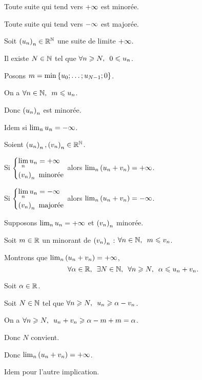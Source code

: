\begin{prop}
Toute suite qui tend vers \(+\infty\) est minorée.

Toute suite qui tend vers \(-\infty\) est majorée.
\end{prop}

\begin{dem}
Soit \(\left(u_n\right)_n\in\mathbb{R}^{\mathbb{N}}\) une suite de limite \(+\infty\).

Il existe \(N\in\mathbb{N}\) tel que \(\quantifs{\forall n\geq N}0\leq u_n\).

Posons \(m=\min\left\lbrace u_0;\dots;u_{N-1};0\right\rbrace\).

On a \(\quantifs{\forall n\in\N}m\leq u_n\).

Donc \(\left(u_n\right)_n\) est minorée.

Idem si \(\lim_nu_n=-\infty\).
\end{dem}

\begin{prop}
Soient \(\left(u_n\right)_n,\left(v_n\right)_n\in\mathbb{R}^{\mathbb{N}}\).

Si \(\begin{dcases}\lim_nu_n=+\infty \\ \left(v_n\right)_n\text{ minorée}\end{dcases}\) alors \(\lim_n\left(u_n+v_n\right)=+\infty\).

Si \(\begin{dcases}\lim_nu_n=-\infty \\ \left(v_n\right)_n\text{ majorée}\end{dcases}\) alors \(\lim_n\left(u_n+v_n\right)=-\infty\).
\end{prop}

\begin{dem}
Supposons \(\lim_nu_n=+\infty\) et \(\left(v_n\right)_n\) minorée.

Soit \(m\in\mathbb{R}\) un minorant de \(\left(v_n\right)_n\) : \(\quantifs{\forall n\in\N}m\leq v_n\).

Montrons que \(\lim_n\left(u_n+v_n\right)=+\infty\), \cad \[\quantifs{\forall\alpha\in\R;\exists N\in\N;\forall n\geq N}\alpha\leq u_n+v_n.\]

Soit \(\alpha\in\mathbb{R}\).

Soit \(N\in\mathbb{N}\) tel que \(\quantifs{\forall n\geq N}u_n\geq\alpha-v_n\).

On a \(\quantifs{\forall n\geq N}u_n+v_n\geq\alpha-m+m=\alpha\).

Donc \(N\) convient.

Donc \(\lim_n\left(u_n+v_n\right)=+\infty\).

Idem pour l'autre implication.
\end{dem}

